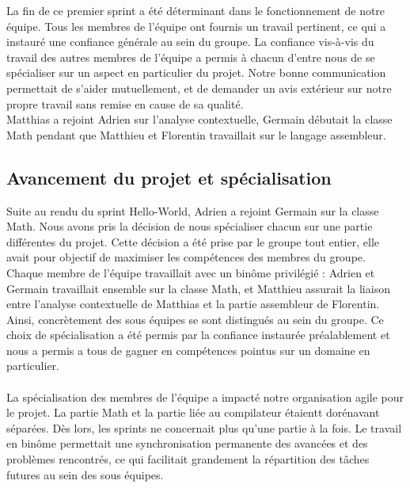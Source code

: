 \documentclass{article}
\begin{document}
La fin de ce premier sprint a été déterminant dans le fonctionnement de notre équipe. Tous les membres de l'équipe ont fournis un travail pertinent, ce qui a instauré une confiance générale au sein du groupe. La confiance vis-à-vis du travail des autres membres de l'équipe a permis à chacun d'entre nous de se spécialiser sur un aspect en particulier du projet. Notre bonne communication permettait de s'aider mutuellement, et de demander un avis extérieur sur notre propre travail sans remise en cause de sa qualité.\\
Matthias a rejoint Adrien sur l'analyse contextuelle, Germain débutait la classe Math pendant que Matthieu et Florentin travaillait sur le langage assembleur.

\subsection{Avancement du projet et spécialisation}
Suite au rendu du sprint Hello-World, Adrien a rejoint Germain sur la classe Math. Nous avons pris la décision de nous spécialiser chacun sur une partie différentes du projet. Cette décision a été prise par le groupe tout entier, elle avait pour objectif de maximiser les compétences des membres du groupe. Chaque membre de l'équipe travaillait avec un binôme privilégié : Adrien et Germain travaillait ensemble sur la classe Math, et Matthieu assurait la liaison entre l'analyse contextuelle de Matthias et la partie assembleur de Florentin. \\
Ainsi, concrètement des sous équipes se sont distingués au sein du groupe. Ce choix de spécialisation a été permis par la confiance instaurée préalablement et nous a permis a tous de gagner en compétences pointus sur un domaine en particulier. \\
\\

La spécialisation des membres de l'équipe a impacté notre organisation agile pour le projet. La partie Math et la partie liée au compilateur étaientt dorénavant séparées. Dès lors, les sprints ne concernait plus qu'une partie à la fois. Le travail en binôme permettait une synchronisation permanente des avancées et des problèmes rencontrés, ce qui facilitait grandement la répartition des tâches futures au sein des sous équipes.
\end{document}
